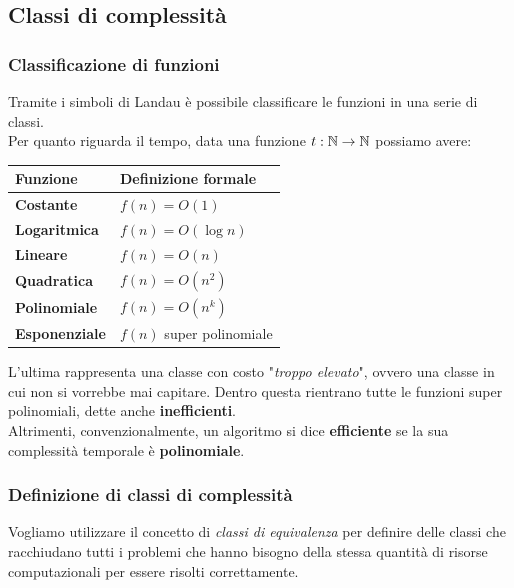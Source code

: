 \subsection{Classi di complessità}

\subsubsection{Classificazione di funzioni}

Tramite i simboli di Landau è possibile classificare le funzioni in una serie di classi.\\

Per quanto riguarda il tempo, data una funzione $t: \mathbb{N} \rightarrow \mathbb{N}$ possiamo avere: 
\begin{center}
	\centering
	\renewcommand{\arraystretch}{1.8}
	\begin{tabular}{| C{100000000000em} | C{100000000000000000em} |}
		\hline
		\textbf{Funzione} & \textbf{Definizione formale} \\
		\hline
		\textbf{Costante} & $f(n) = O(1)$ \\
		\hline
		\textbf{Logaritmica} & $f(n) = O(\log n)$ \\
		\hline
		\textbf{Lineare} & $f(n) = O(n)$ \\
		\hline
		\textbf{Quadratica} & $f(n) = O(n^2)$ \\
		\hline
		\textbf{Polinomiale} & $f(n) = O(n^k)$ \\
		\hline
		\textbf{Esponenziale} & $f(n)$ super polinomiale \\
		\hline
	\end{tabular}
\end{center}

L'ultima rappresenta una classe con costo "\textit{troppo elevato}", ovvero una classe in cui non si vorrebbe mai capitare. Dentro questa rientrano tutte le funzioni super polinomiali, dette anche \textbf{inefficienti}.\\

Altrimenti, convenzionalmente, un algoritmo si dice \textbf{efficiente} se la sua complessità temporale è \textbf{polinomiale}.\\

\subsubsection{Definizione di classi di complessità}

Vogliamo utilizzare il concetto di \textit{classi di equivalenza} per definire delle classi che racchiudano tutti i problemi che hanno bisogno della stessa quantità di risorse computazionali per essere risolti correttamente.\\

